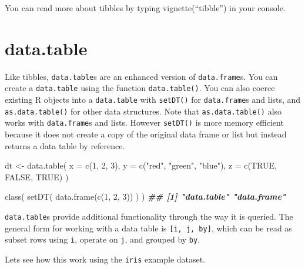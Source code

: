 \documentclass[
]{book}
\newenvironment{Shaded}{\begin{snugshade}}{\end{snugshade}}
\newcommand{\AttributeTok}[1]{\textcolor[rgb]{0.77,0.63,0.00}{#1}}
\newcommand{\ConstantTok}[1]{\textcolor[rgb]{0.00,0.00,0.00}{#1}}
\newcommand{\DecValTok}[1]{\textcolor[rgb]{0.00,0.00,0.81}{#1}}
\newcommand{\DocumentationTok}[1]{\textcolor[rgb]{0.56,0.35,0.01}{\textbf{\textit{#1}}}}
\newcommand{\FunctionTok}[1]{\textcolor[rgb]{0.00,0.00,0.00}{#1}}
\newcommand{\NormalTok}[1]{#1}
\newcommand{\OtherTok}[1]{\textcolor[rgb]{0.56,0.35,0.01}{#1}}
\newcommand{\StringTok}[1]{\textcolor[rgb]{0.31,0.60,0.02}{#1}}
\begin{document}
You can read more about tibbles by typing vignette(``tibble'') in your console.

\hypertarget{data-table}{%
\section{data.table}\label{data-table}}

Like tibbles, \texttt{data.table}s are an enhanced version of \texttt{data.frame}s. You can create a \texttt{data.table} using the function \texttt{data.table()}. You can also coerce existing R objects into a \texttt{data.table} with \texttt{setDT()} for \texttt{data.frame}s and lists, and \texttt{as.data.table()} for other data structures. Note that \texttt{as.data.table()} also works with \texttt{data.frame}s and lists. However \texttt{setDT()} is more memory efficient because it does not create a copy of the original data frame or list but instead returns a data table by reference.

\begin{Shaded}
\begin{Highlighting}[]
\NormalTok{dt }\OtherTok{\textless{}{-}} \FunctionTok{data.table}\NormalTok{(}
  \AttributeTok{x =} \FunctionTok{c}\NormalTok{(}\DecValTok{1}\NormalTok{, }\DecValTok{2}\NormalTok{, }\DecValTok{3}\NormalTok{),}
  \AttributeTok{y =} \FunctionTok{c}\NormalTok{(}\StringTok{"red"}\NormalTok{, }\StringTok{"green"}\NormalTok{, }\StringTok{"blue"}\NormalTok{),}
  \AttributeTok{z =} \FunctionTok{c}\NormalTok{(}\ConstantTok{TRUE}\NormalTok{, }\ConstantTok{FALSE}\NormalTok{, }\ConstantTok{TRUE}\NormalTok{)}
\NormalTok{)}

\FunctionTok{class}\NormalTok{(}
  \FunctionTok{setDT}\NormalTok{(}
    \FunctionTok{data.frame}\NormalTok{(}\FunctionTok{c}\NormalTok{(}\DecValTok{1}\NormalTok{, }\DecValTok{2}\NormalTok{, }\DecValTok{3}\NormalTok{))}
\NormalTok{  )}
\NormalTok{)}
\DocumentationTok{\#\# [1] "data.table" "data.frame"}
\end{Highlighting}
\end{Shaded}

\texttt{data.table}s provide additional functionality through the way it is queried. The general form for working with a data table is \texttt{{[}i,\ j,\ by{]}}, which can be read as subset rows using \texttt{i}, operate on \texttt{j}, and grouped by \texttt{by}.

Lets see how this work using the \texttt{iris} example dataset.
\end{document}
